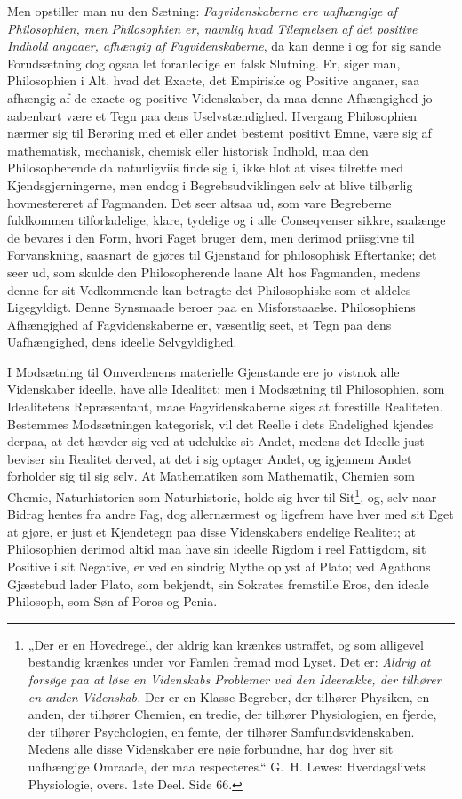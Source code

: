 \documentclass[12pt,a4paper]{book}
\begin{document}
Men opstiller man nu den Sætning: \emph{Fagvidenskaberne ere
uafhængige af Philosophien, men Philosophien er, navnlig hvad
Tilegnelsen af det positive Indhold angaaer, afhængig af
Fagvidenskaberne}, da kan denne i og for sig sande Forudsætning dog
ogsaa let foranledige en falsk Slutning. Er, siger man, Philosophien
i Alt, hvad det Exacte, det Empiriske og Positive angaaer, saa
afhængig af de exacte og positive Videnskaber, da maa denne
Afhængighed jo aabenbart være et Tegn paa dens Uselvstændighed.
Hvergang Philosophien nærmer sig til Berøring med et eller andet
bestemt positivt Emne, være sig af mathematisk, mechanisk, chemisk
eller historisk Indhold, maa den Philosopherende da naturligviis finde
sig i, ikke blot at vises tilrette med Kjendsgjerningerne, men endog i
Begrebsudviklingen selv at blive tilbørlig hovmestereret af
Fagmanden. Det seer altsaa ud, som vare Begreberne fuldkommen
tilforladelige, klare, tydelige og i alle Conseqvenser sikkre,
saalænge de bevares i den Form, hvori Faget bruger dem, men derimod
priisgivne til Forvanskning, saasnart de gjøres til Gjenstand for
philosophisk Eftertanke; det seer ud, som skulde den Philosopherende
laane Alt hos Fagmanden, medens denne for sit Vedkommende kan betragte
det Philosophiske som et aldeles Ligegyldigt. Denne Synsmaade beroer
paa en Misforstaaelse. Philosophiens Afhængighed af Fagvidenskaberne
er, væsentlig seet, et Tegn paa dens Uafhængighed, dens ideelle
Selvgyldighed.

I Modsætning til Omverdenens materielle Gjenstande ere jo vistnok alle
Videnskaber ideelle, have alle Idealitet; men i Modsætning til
Philosophien, som Idealitetens Repræsentant, maae Fagvidenskaberne
siges at forestille Realiteten. Bestemmes Modsætningen kategorisk,
vil det Reelle i dets Endelighed kjendes derpaa, at det hævder sig ved
at udelukke sit Andet, medens det Ideelle just beviser sin Realitet
derved, at
\setcounter{footnote}{0}
det i sig optager Andet, og igjennem Andet forholder sig til sig
selv. At Mathematiken som Mathematik, Chemien som Chemie,
Naturhistorien som Naturhistorie, holde sig hver til
Sit\footnote{„Der er en Hovedregel, der aldrig kan krænkes ustraffet,
og som alligevel bestandig krænkes under vor Famlen fremad mod Lyset.
Det er: \emph{Aldrig at forsøge paa at løse en Videnskabs Problemer
ved den Ideerække, der tilhører en anden Videnskab.} Der er en Klasse
Begreber, der tilhører Physiken, en anden, der tilhører Chemien, en
tredie, der tilhører Physiologien, en fjerde, der tilhører
Psychologien, en femte, der tilhører Samfundsvidenskaben. Medens alle
disse Videnskaber ere nøie forbundne, har dog hver sit uafhængige
Omraade, der maa respecteres.“ G.~H. Lewes: Hverdagslivets
Physiologie, overs. 1ste Deel. Side 66.}, og, selv naar Bidrag hentes
fra andre Fag, dog allernærmest og ligefrem have hver med sit Eget at
gjøre, er just et Kjendetegn paa disse Videnskabers endelige Realitet;
at Philosophien derimod altid maa have sin ideelle Rigdom i reel
Fattigdom, sit Positive i sit Negative, er ved en sindrig Mythe oplyst
af Plato; ved Agathons Gjæstebud lader Plato, som bekjendt, sin
Sokrates fremstille Eros, den ideale Philosoph, som Søn af Poros og
Penia.
\end{document}

